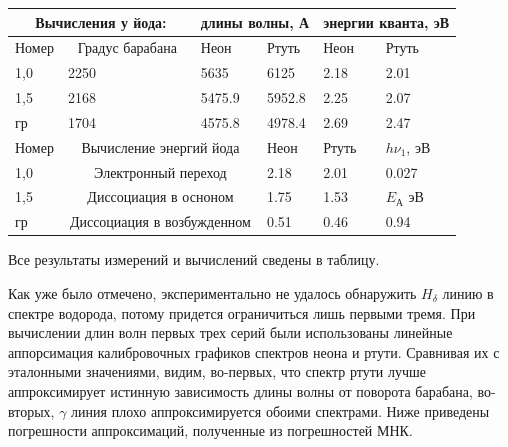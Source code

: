 \documentclass[%
 reprint,
 amsmath,amssymb,
 aps,
]{revtex4-2}
\begin{document}
\begin{table}[]
\begin{tabular}{|l|l|l|l|l|l|}
		\multicolumn{2}{|c|}{{\color[HTML]{FF0000} Вычисления у йода:}}       & \multicolumn{2}{c|}{{\color[HTML]{FF0000} длины волны, А}} & \multicolumn{2}{c|}{{\color[HTML]{FF0000} энергии кванта, эВ}} \\ \hline
		Номер               & \multicolumn{1}{c|}{Градус барабана}            & Неон                        & Ртуть                        & Неон                         & Ртуть                           \\ \hline
		1,0                 & 2250                                            & 5635                        & 6125                         & 2.18                         & 2.01                            \\ \hline
		1,5                 & 2168                                            & 5475.9                      & 5952.8                       & 2.25                         & 2.07                            \\ \hline
		гр                  & 1704                                            & 4575.8                      & 4978.4                       & 2.69                         & 2.47                            \\ \hline
		Номер               & \multicolumn{2}{c|}{{\color[HTML]{FF0000} Вычисление энергий йода}}           & Неон                         & Ртуть                        & $h\nu_1$, эВ                       \\ \hline
		1,0                 & \multicolumn{2}{c|}{Электронный переход}                                      & 2.18                         & 2.01                         & 0.027                           \\ \hline
		1,5                 & \multicolumn{2}{c|}{Диссоциация в осноном}                                    & 1.75                         & 1.53                         & $E_{А}$ эВ                        \\ \hline
		гр                  & \multicolumn{2}{c|}{Диссоциация в возбужденном}                               & 0.51                         & 0.46                         & 0.94                            \\ \hline
	\end{tabular}
\end{table}

Все результаты измерений и вычислений сведены в таблицу. 

Как уже было отмечено, экспериментально не удалось обнаружить $H_\delta$ линию в спектре водорода, потому придется ограничиться лишь первыми тремя. При вычислении длин волн первых трех серий были использованы линейные аппорсимация калибровочных графиков спектров неона и ртути. Сравнивая их с эталонными значениями, видим, во-первых, что спектр ртути лучше аппроксимирует истинную зависимость длины волны от поворота барабана, во- вторых, $\gamma$ линия плохо аппроксимируется обоими спектрами. Ниже приведены погрешности аппроксимаций, полученные из погрешностей МНК.
\end{document}
